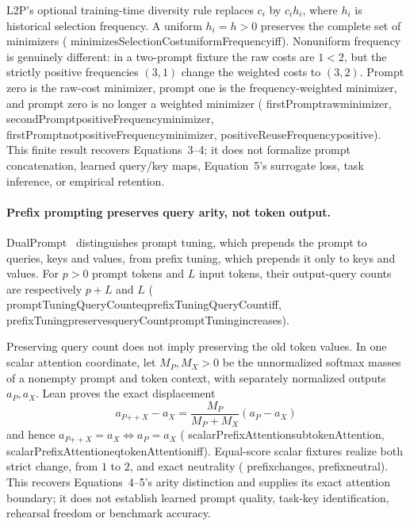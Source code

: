 \documentclass[11pt]{article}
\newcommand{\leanname}[1]{{\scriptsize\ttfamily
  \def\_{\textunderscore\allowbreak}#1}}
\begin{document}
L2P's optional training-time diversity rule replaces $c_i$ by $c_i h_i$,
where $h_i$ is historical selection frequency.  A uniform $h_i=h>0$
preserves the complete set of minimizers
(\leanname{minimizesSelectionCost\_uniformFrequency\_iff}).  Nonuniform
frequency is genuinely different: in a two-prompt fixture the raw costs are
$1<2$, but the strictly positive frequencies $(3,1)$ change the weighted
costs to $(3,2)$.  Prompt zero is the raw-cost minimizer, prompt one is the
frequency-weighted minimizer, and prompt zero is no longer a weighted
minimizer
(\leanname{firstPrompt\_raw\_minimizer},
\leanname{secondPrompt\_positiveFrequency\_minimizer},
\leanname{firstPrompt\_not\_positiveFrequency\_minimizer},
\leanname{positiveReuseFrequency\_positive}).
This finite result recovers Equations~3--4; it does not formalize prompt
concatenation, learned query/key maps, Equation~5's surrogate loss, task
inference, or empirical retention.

\paragraph{Prefix prompting preserves query arity, not token output.}
DualPrompt~\cite{wang2022dualprompt} distinguishes prompt tuning, which
prepends the prompt to queries, keys and values, from prefix tuning, which
prepends it only to keys and values.  For $p>0$ prompt tokens and $L$ input
tokens, their output-query counts are respectively $p+L$ and $L$
(\leanname{promptTuningQueryCount\_eq\_prefixTuningQueryCount\_iff},
\leanname{prefixTuning\_preserves\_queryCount\_promptTuning\_increases}).

Preserving query count does not imply preserving the old token values.  In one
scalar attention coordinate, let $M_P,M_X>0$ be the unnormalized softmax masses
of a nonempty prompt and token context, with separately normalized outputs
$a_P,a_X$.  Lean proves the exact displacement
\[
 a_{P\mathbin{+\!\!+}X}-a_X
 =\frac{M_P}{M_P+M_X}(a_P-a_X)
\]
and hence
$a_{P\mathbin{+\!\!+}X}=a_X\Longleftrightarrow a_P=a_X$
(\leanname{scalarPrefixAttention\_sub\_tokenAttention},
\leanname{scalarPrefixAttention\_eq\_tokenAttention\_iff}).
Equal-score scalar fixtures realize both strict change, from $1$ to $2$, and
exact neutrality
(\leanname{prefix\_changes},
\leanname{prefix\_neutral}).
This recovers Equations~4--5's arity distinction and supplies its exact
attention boundary; it does not establish learned prompt quality, task-key
identification, rehearsal freedom or benchmark accuracy.
\end{document}

